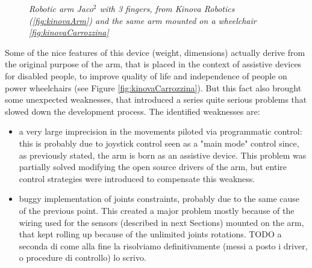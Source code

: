 \begin{figure}
	\centering
	\qquad
	\caption{\textit{Robotic arm Jaco$^2$ with 3 fingers, from Kinova Robotics (\ref{fig:kinovaArm}) and the same arm mounted on a wheelchair \ref{fig:kinovaCarrozzina}}}
\end{figure}

 Some of the nice features of this device (weight, dimensions) actually derive from the original purpose of the arm, that is placed in the context of assistive devices for disabled people, to improve quality of life and independence of people on  power wheelchairs (see Figure \ref{fig:kinovaCarrozzina}). But this fact also brought some unexpected weaknesses, that introduced a series quite serious problems that slowed down the development process. The identified weaknesses are:
 \begin{itemize}
 	\item a very large imprecision in the movements piloted via programmatic control: this is probably due to joystick control seen as a "main mode" control since, as previously stated, the arm is born as an assistive device. This problem was partially solved modifying the open source drivers of the arm, but entire control strategies were introduced to compensate this weakness.
 	\item buggy implementation of joints constraints, probably due to the same cause of the previous point. This created a major problem mostly because of the wiring used for the sensors (described in next Sections) mounted on the arm, that kept rolling up because of the unlimited joints rotations. TODO a seconda di come alla fine la risolviamo definitivamente (messi a posto i driver, o procedure di controllo) lo scrivo.
 \end{itemize}
 
